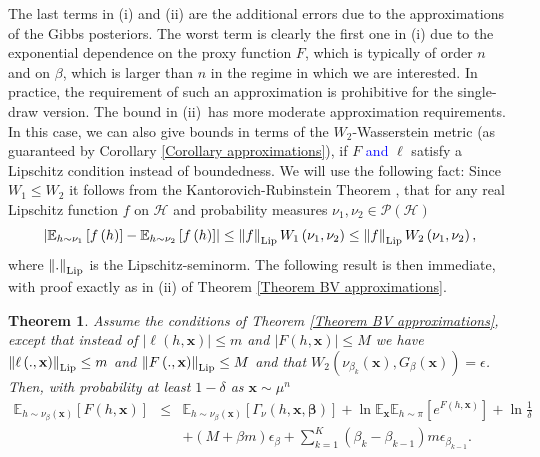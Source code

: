 \documentclass{article} %
\newtheorem{theorem}{Theorem}[section]
\newcommand{\EM}[1]{\textcolor{blue}{#1}}
\begin{document}
The last terms in (i) and (ii) are the additional errors due to the
approximations of the Gibbs posteriors. The worst term is clearly the first
one in (i) due to the exponential dependence on the proxy function $F$,
which is typically of order $n$ and on $\beta $, which is larger than $n$ in
the regime in which we are interested. In practice, the requirement of such
an approximation is prohibitive for the single-draw version. The bound in
(ii)\ has more moderate approximation requirements. In this case, we can also
give bounds in terms of the $W_{2}$-Wasserstein metric (as
guaranteed by Corollary \ref{Corollary approximations}), if $F$ \EM{and} $\ell$ satisfy a Lipschitz
condition instead of boundedness.  We will use the
following fact: Since $W_{1}\leq W_{2}$ it follows from the
Kantorovich-Rubinstein Theorem \citep{villani2009optimal}, that for any
real Lipschitz function $f$ on $\mathcal{H}$ and probability measures $\nu
_{1},\nu _{2}\in \mathcal{P}\left( \mathcal{H}\right) $%
\begin{equation*}
\left\vert \mathbb{E}_{h\sim \nu _{1}}\left[ f\left( h\right) \right] -%
\mathbb{E}_{h\sim \nu _{2}}\left[ f\left( h\right) \right] \right\vert \leq
\left\Vert f\right\Vert _{\rm Lip}W_{1}\left( \nu _{1},\nu _{2}\right) \leq
\left\Vert f\right\Vert _{\rm Lip}W_{2}\left( \nu _{1},\nu _{2}\right) ,
\end{equation*}%
where $\left\Vert .\right\Vert _{\rm Lip}$ is the Lipschitz-seminorm. The
following result is then immediate, with proof exactly as in (ii) of Theorem %
\ref{Theorem BV approximations}.

\begin{theorem}
\label{Theorem Wasserstein}Assume the conditions of Theorem \ref{Theorem BV
approximations}, except that instead of $\left\vert \ell \left( h,\mathbf{x}%
\right) \right\vert \leq m$ and $\left\vert F\left( h,\mathbf{x}\right)
\right\vert \leq M$ we have $\left\Vert \ell \left( .,\mathbf{x}\right)
\right\Vert _{\rm Lip}\leq m$ and $\left\Vert F\left( .,\mathbf{x}\right)
\right\Vert _{\rm Lip}\leq M$ and that $W_{2}\left( \nu _{\beta _{k}}\left( 
\mathbf{x}\right) ,G_{\beta }\left( \mathbf{x}\right) \right) =\epsilon $.
Then, with probability at least $1-\delta $ as $\mathbf{x}\sim \mu ^{n}$ 
\begin{eqnarray*}
\mathbb{E}_{h\sim \nu _{\beta }\left( \mathbf{x}\right) }\left[ F\left( h,%
\mathbf{x}\right) \right] &\leq &\mathbb{E}_{h\sim \nu _{\beta }\left( 
\mathbf{x}\right) }\left[ \Gamma _{\nu }\left( h,\mathbf{x},\bm{\beta}%
\right) \right] +\ln \mathbb{E}_{\mathbf{x}}\mathbb{E}_{h\sim \pi }\left[
e^{F\left( h,\mathbf{x}\right) }\right] +\ln \frac{1}{\delta } \\
&&+\left( M+\beta m\right) \epsilon _{\beta }+\sum_{k=1}^{K}\left( \beta
_{k}-\beta _{k-1}\right) m\epsilon _{\beta _{k-1}}.
\end{eqnarray*}
\end{theorem}
\end{document}
